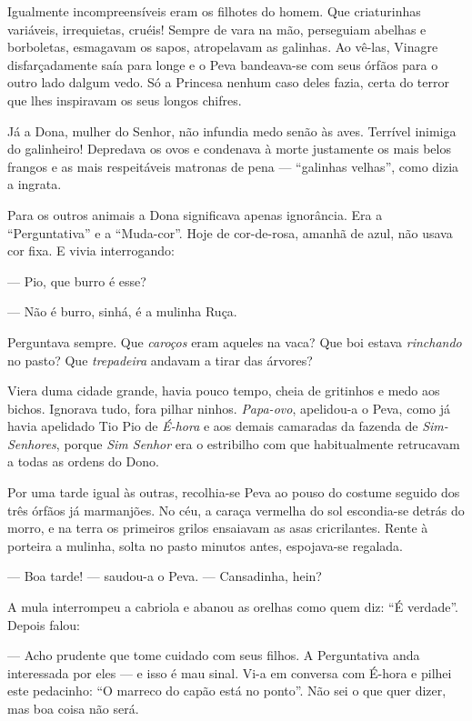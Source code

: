 Igualmente incompreensíveis eram os filhotes do homem. Que criaturinhas
variáveis, irrequietas, cruéis! Sempre de vara na mão, perseguiam
abelhas e borboletas, esmagavam os sapos, atropelavam as galinhas. Ao
vê-las, Vinagre disfarçadamente saía para longe e o Peva bandeava-se com
seus órfãos para o outro lado dalgum vedo. Só a Princesa nenhum caso
deles fazia, certa do terror que lhes inspiravam os seus longos chifres.

Já a Dona, mulher do Senhor, não infundia medo senão às aves. Terrível
inimiga do galinheiro! Depredava os ovos e condenava à morte justamente
os mais belos frangos e as mais respeitáveis matronas de pena ---
``galinhas velhas'', como dizia a ingrata.

Para os outros animais a Dona significava apenas ignorância. Era a
``Perguntativa'' e a ``Muda-cor''. Hoje de cor-de-rosa, amanhã de azul,
não usava cor fixa. E vivia interrogando:

--- Pio, que burro é esse?

--- Não é burro, sinhá, é a mulinha Ruça.

Perguntava sempre. Que \emph{caroços} eram aqueles na vaca? Que boi
estava \emph{rinchando} no pasto? Que \emph{trepadeira} andavam a tirar
das árvores?

Viera duma cidade grande, havia pouco tempo, cheia de gritinhos e medo
aos bichos. Ignorava tudo, fora pilhar ninhos. \emph{Papa-ovo},
apelidou-a o Peva, como já havia apelidado Tio Pio de \emph{É-hora} e
aos demais camaradas da fazenda de \emph{Sim-Senhores}, porque \emph{Sim
Senhor} era o estribilho com que habitualmente retrucavam a todas as
ordens do Dono.

Por uma tarde igual às outras, recolhia-se Peva ao pouso do costume
seguido dos três órfãos já marmanjões. No céu, a caraça vermelha do sol
escondia-se detrás do morro, e na terra os primeiros grilos ensaiavam as
asas cricrilantes. Rente à porteira a mulinha, solta no pasto minutos
antes, espojava-se regalada.

--- Boa tarde! --- saudou-a o Peva. --- Cansadinha, hein?

A mula interrompeu a cabriola e abanou as orelhas como quem diz: ``É
verdade''. Depois falou:

--- Acho prudente que tome cuidado com seus filhos. A Perguntativa anda
interessada por eles --- e isso é mau sinal. Vi-a em conversa com É-hora
e pilhei este pedacinho: ``O marreco do capão está no ponto''. Não sei o
que quer dizer, mas boa coisa não será.

